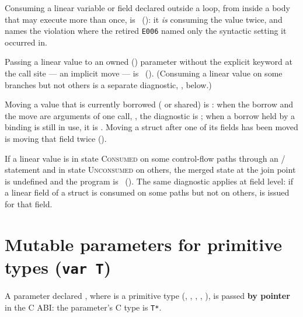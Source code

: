 \begin{constraint}
  Consuming a linear variable or field declared outside a loop, from inside a body that may
  execute more than once, is \illformed{}~(): it \emph{is} consuming the value
  twice, and  names the violation where the retired \texttt{E006} named only the
  syntactic setting it occurred in.
\end{constraint}

\begin{constraint}
  Passing a linear value to an owned () parameter without the
  explicit  keyword at the call site --- an implicit move --- is
  \illformed{}~().  (Consuming a linear value on some branches
  but not others is a separate diagnostic, , below.)
\end{constraint}

\begin{constraint}
  Moving a value that is currently borrowed ( or shared) is \illformed{}: when the
  borrow and the move are arguments of one call, , the diagnostic is
  ; when a borrow held by a binding is still in use, it is .
  Moving a struct after one of its fields has been moved is moving that field twice
  ().
\end{constraint}

\begin{constraint}
  If a linear value is in state \textsc{Consumed} on some control-flow
  paths through an / statement and in state
  \textsc{Unconsumed} on others, the merged state at the join point
  is undefined and the program is \illformed{}~(). The
  same diagnostic applies at field level: if a linear field of a
  struct is consumed on some paths but not on others, 
  is issued for that field.
\end{constraint}

\section{Mutable parameters for primitive types (\texttt{var T})}
\label{sec:own.var-primitive}

\pnum
A parameter declared , where  is a primitive type
(, , , , ), is passed
\textbf{by pointer} in the C ABI: the parameter's C type is \texttt{T*}.

